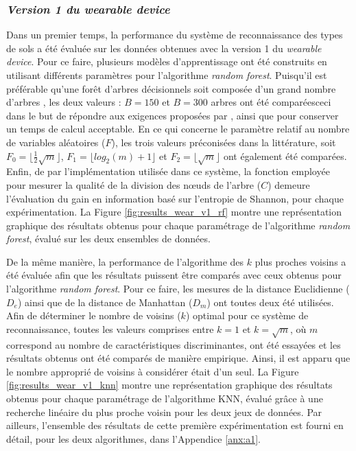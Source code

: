 \subsubsection{\textit{Version 1 du wearable device}}

Dans un premier temps, la performance du système de reconnaissance des types de sols a été évaluée sur les données obtenues avec la version 1 du \textit{wearable device}. Pour ce faire, plusieurs modèles d'apprentissage ont été construits en utilisant différents paramètres pour l'algorithme \textit{random forest}. Puisqu'il est préférable qu'une forêt d'arbres décisionnels soit composée d'un grand nombre d'arbres \citep{Breiman2001}, les deux valeurs : $B=150$ et $B=300$ arbres ont été comparées\textemdash ceci dans le but de répondre aux exigences proposées par \cite{Breiman2001}, ainsi que pour conserver un temps de calcul acceptable. En ce qui concerne le paramètre relatif au nombre de variables aléatoires ($F$), les trois valeurs préconisées dans la littérature, soit $F_0=\lfloor \frac{1}{2}\sqrt{m}\rfloor$, $F_1=\lfloor log_2(m) + 1\rfloor$ et $F_2=\lfloor \sqrt{m}\rfloor$ ont également été comparées. Enfin, de par l'implémentation utilisée dans ce système, la fonction employée pour mesurer la qualité de la division des n\oe{}uds de l'arbre ($C$) demeure l’évaluation du gain en information basé sur l’entropie de Shannon, pour chaque expérimentation. La Figure \ref{fig:results_wear_v1_rf} montre une représentation graphique des résultats obtenus pour chaque paramétrage de l'algorithme \textit{random forest}, évalué sur les deux ensembles de données.

De la même manière, la performance de l'algorithme des $k$ plus proches voisins a été évaluée afin que les résultats puissent être comparés avec ceux obtenus pour l'algorithme \textit{random forest}. Pour ce faire, les mesures de la distance Euclidienne ($D_e$) ainsi que de la distance de Manhattan ($D_m$) ont toutes deux été utilisées. Afin de déterminer le nombre de voisins ($k$) optimal pour ce système de reconnaissance, toutes les valeurs comprises entre $k=1$ et $k=\sqrt{m}$, où $m$ correspond au nombre de caractéristiques discriminantes, ont été essayées et les résultats obtenus ont été comparés de manière empirique. Ainsi, il est apparu que le nombre approprié de voisins à considérer était d'un seul. La Figure \ref{fig:results_wear_v1_knn} montre une représentation graphique des résultats obtenus pour chaque paramétrage de l'algorithme \acs{KNN}, évalué grâce à une recherche linéaire du plus proche voisin pour les deux jeux de données. Par ailleurs, l'ensemble des résultats de cette première expérimentation est fourni en détail, pour les deux algorithmes, dans l'Appendice \ref{anx:a1}.

